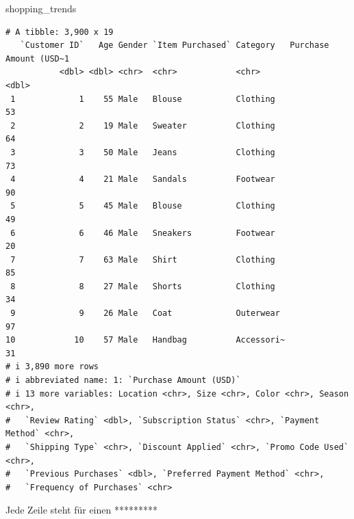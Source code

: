 \documentclass[
  letterpaper,
  DIV=11]{scrartcl}
\newenvironment{Shaded}{\begin{snugshade}}{\end{snugshade}}
\newcommand{\NormalTok}[1]{\textcolor[rgb]{0.00,0.23,0.31}{#1}}
\begin{document}
\begin{Shaded}
\begin{Highlighting}[]
\NormalTok{shopping\_trends}
\end{Highlighting}
\end{Shaded}

\begin{verbatim}
# A tibble: 3,900 x 19
   `Customer ID`   Age Gender `Item Purchased` Category   Purchase Amount (USD~1
           <dbl> <dbl> <chr>  <chr>            <chr>                       <dbl>
 1             1    55 Male   Blouse           Clothing                       53
 2             2    19 Male   Sweater          Clothing                       64
 3             3    50 Male   Jeans            Clothing                       73
 4             4    21 Male   Sandals          Footwear                       90
 5             5    45 Male   Blouse           Clothing                       49
 6             6    46 Male   Sneakers         Footwear                       20
 7             7    63 Male   Shirt            Clothing                       85
 8             8    27 Male   Shorts           Clothing                       34
 9             9    26 Male   Coat             Outerwear                      97
10            10    57 Male   Handbag          Accessori~                     31
# i 3,890 more rows
# i abbreviated name: 1: `Purchase Amount (USD)`
# i 13 more variables: Location <chr>, Size <chr>, Color <chr>, Season <chr>,
#   `Review Rating` <dbl>, `Subscription Status` <chr>, `Payment Method` <chr>,
#   `Shipping Type` <chr>, `Discount Applied` <chr>, `Promo Code Used` <chr>,
#   `Previous Purchases` <dbl>, `Preferred Payment Method` <chr>,
#   `Frequency of Purchases` <chr>
\end{verbatim}

Jede Zeile steht für einen *********
\end{document}
